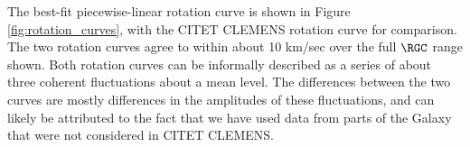 The best-fit piecewise-linear rotation curve is shown in Figure \ref{fig:rotation_curves}, with the CITET CLEMENS rotation curve for comparison. 
The two rotation curves agree to within about 10 km/sec over the full $\RGC$ range shown.
Both rotation curves can be informally described as a series of about three coherent fluctuations about a mean level. 
The differences between the two curves are mostly differences in the amplitudes of these fluctuations, and can likely be attributed to the fact that we have used data from parts of the Galaxy that were not considered in CITET CLEMENS. 




